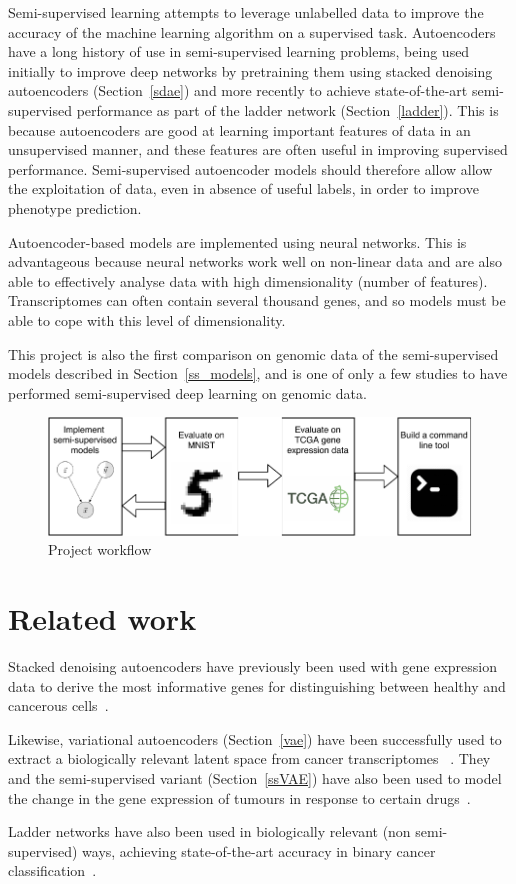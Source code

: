 Semi-supervised learning attempts to leverage unlabelled data to improve the accuracy of the machine learning
algorithm on a supervised task. Autoencoders have a long history of use in semi-supervised learning problems,
being used initially to improve deep networks by pretraining them using stacked denoising autoencoders (Section~\ref{sdae})
and more recently to achieve state-of-the-art semi-supervised performance as part of the ladder 
network (Section~\ref{ladder}). This is because autoencoders are good at learning 
important features of data in an unsupervised manner, and these features are often useful in improving 
supervised performance. Semi-supervised autoencoder models should therefore allow 
allow the exploitation of data, even in absence of useful labels, in order to improve phenotype prediction.

Autoencoder-based models are implemented
using neural networks. This is advantageous because neural networks work well on non-linear data and are
also able to effectively analyse data with high dimensionality (number of features). Transcriptomes can
often contain several thousand genes, and so models must be able to cope with this level of dimensionality.

This project is also the first comparison on genomic data of the semi-supervised models described in Section~\ref{ss_models}, and is one of only a few
studies to have performed semi-supervised deep learning on genomic data.

\begin{figure}[H]
\centering\includegraphics[scale=.9]{figs/workflow.pdf}
\caption{Project workflow}
\label{fig:workflow}
\end{figure}


\section{Related work}

Stacked denoising autoencoders have previously been used with gene expression data to derive the most informative
genes for distinguishing between healthy and cancerous cells~\cite{8217828}.

Likewise, variational autoencoders (Section~\ref{vae}) have been successfully used to extract a biologically relevant latent 
space from cancer transcriptomes ~\cite{Way2018ExtractingAB}. They and the semi-supervised variant (Section~\ref{ssVAE}) 
have also been used to model the change in the gene expression of tumours in response to certain drugs~\cite{10.1093/bioinformatics/btz158}.

Ladder networks have also been used in biologically relevant (non semi-supervised)
ways, achieving state-of-the-art accuracy in binary cancer classification~\cite{10.1007/978-3-319-78723-7_23}.
